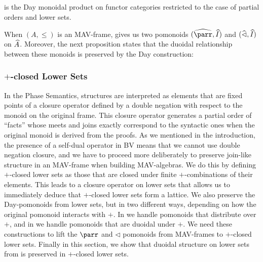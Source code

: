 \begin{remark}
   is the Day monoidal product on functor
  categories \cite{Day_1970} restricted to the case of partial orders
  and lower sets.
\end{remark}

\begin{remark}
  When $(A, \leq)$ is an MAV-frame,  gives us two pomonoids
  $(\Day{\parr}, \Day{I})$ and $(\mathop{\widehat{\lhd}}, \mathop{\widehat{I}})$ on
  $\widehat{A}$. Moreover, the next proposition states that the
  duoidal relationship between these monoids is preserved by the Day
  construction:
\end{remark}


\subsubsection{$+$-closed Lower Sets}
\label{sec:closed-lower-sets}

In the Phase Semantics, structures are interpreted as elements that are
fixed points of a closure operator defined by a double negation with
respect to the monoid on the original frame. This closure operator
generates a partial order of ``facts'' whose meets and joins exactly
correspond to the syntactic ones when the original monoid is derived
from the proofs. As we mentioned in the introduction, the presence of
a self-dual operator in BV means that we cannot use double negation
closure, and we have to proceed more deliberately to preserve
join-like structure in an MAV-frame when building MAV-algebras. We do
this by defining $+$-closed lower sets as those that are closed under
finite $+$-combinations of their elements. This leads to a closure
operator on lower sets that allows us to immediately deduce that
$+$-closed lower sets form a lattice. We also preserve the
Day-pomonoids from lower sets, but in two different ways, depending on
how the original pomonoid interacts with $+$. In  we handle pomonoids that distribute
over $+$, and in  we
handle pomonoids that are duoidal under $+$. We need these
constructions to lift the $\parr$ and $\lhd$ pomonoids from
MAV-frames to $+$-closed lower sets. Finally in this section, we show
that duoidal structure on lower sets from
 is preserved in $+$-closed lower sets.

